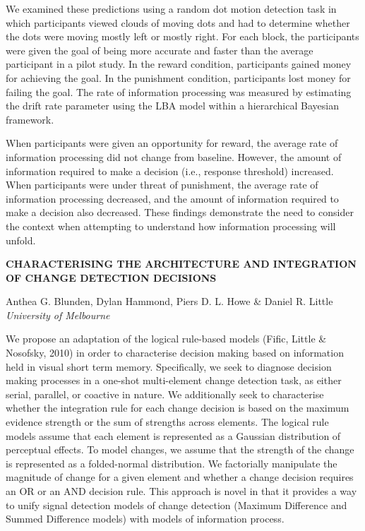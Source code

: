 \documentclass[]{article}
\begin{document}
We examined these predictions using a random dot motion detection task
in which participants viewed clouds of moving dots and had to determine
whether the dots were moving mostly left or mostly right. For each
block, the participants were given the goal of being more accurate and
faster than the average participant in a pilot study. In the reward
condition, participants gained money for achieving the goal. In the
punishment condition, participants lost money for failing the goal. The
rate of information processing was measured by estimating the drift rate
parameter using the LBA model within a hierarchical Bayesian framework.

When participants were given an opportunity for reward, the average rate
of information processing did not change from baseline. However, the
amount of information required to make a decision (i.e., response
threshold) increased. When participants were under threat of punishment,
the average rate of information processing decreased, and the amount of
information required to make a decision also decreased. These findings
demonstrate the need to consider the context when attempting to
understand how information processing will unfold.\\
\pagebreak  

\textbf{CHARACTERISING THE ARCHITECTURE AND INTEGRATION OF CHANGE
DETECTION DECISIONS}

Anthea G. Blunden, Dylan Hammond, Piers D. L. Howe \& Daniel R. Little\\
\emph{University of Melbourne}

We propose an adaptation of the logical rule-based models (Fific, Little
\& Nosofsky, 2010) in order to characterise decision making based on
information held in visual short term memory. Specifically, we seek to
diagnose decision making processes in a one-shot multi-element change
detection task, as either serial, parallel, or coactive in nature. We
additionally seek to characterise whether the integration rule for each
change decision is based on the maximum evidence strength or the sum of
strengths across elements. The logical rule models assume that each
element is represented as a Gaussian distribution of perceptual effects.
To model changes, we assume that the strength of the change is
represented as a folded-normal distribution. We factorially manipulate
the magnitude of change for a given element and whether a change
decision requires an OR or an AND decision rule. This approach is novel
in that it provides a way to unify signal detection models of change
detection (Maximum Difference and Summed Difference models) with models
of information process.\\
\pagebreak  
\end{document}
